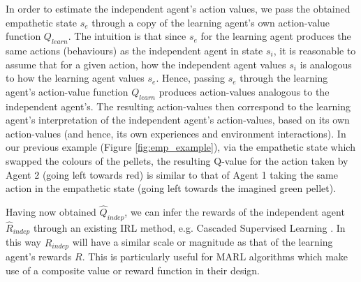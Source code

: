 In order to estimate the independent agent's action values, we pass the obtained empathetic state $s_e$ through a copy of the learning agent's own action-value function $Q_{learn}$. The intuition is that since $s_e$ for the learning agent produces the same actions (behaviours) as the independent agent in state $s_i$, it is reasonable to assume that for a given action, how the independent agent values $s_i$ is analogous to how the learning agent values $s_e$. Hence, passing $s_e$ through the learning agent's action-value function $Q_{learn}$ produces action-values analogous to the independent agent's. The resulting action-values then correspond to the learning agent's interpretation of the independent agent's action-values, based on its own action-values (and hence, its own experiences and environment interactions).
In our previous example (Figure \ref{fig:emp_example}), via the empathetic state which swapped the colours of the pellets, the resulting Q-value for the action taken by Agent 2 (going left towards red) is similar to that of Agent 1 taking the same action in the empathetic state (going left towards the imagined green pellet). 

Having now obtained $\hat{Q}_{indep}$, we can infer the rewards of the independent agent $\hat{R}_{indep}$ through an existing IRL method, e.g. Cascaded Supervised Learning \cite{cascadedSuperIRL2013}. In this way $\hat{R}_{indep}$ will have a similar scale or magnitude as that of the learning agent's rewards $R$. This is particularly useful for MARL algorithms which make use of a composite value or reward function in their design.

